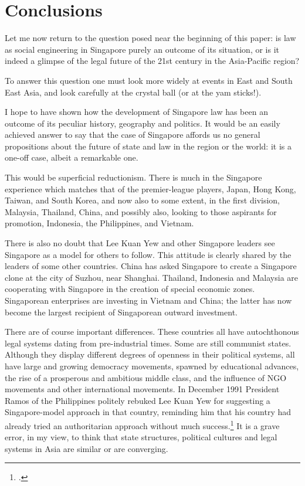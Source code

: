 \section{Conclusions}

Let me now return to the question posed near the beginning of
this paper: is law as social engineering in Singapore purely an
outcome of its situation, or is it indeed a glimpse of the legal
future of the 21st century in the Asia-Pacific region?

To answer this question one must look more widely at events in
East and South East Asia, and look carefully at the crystal ball
(or at the yam sticks!).

I hope to have shown how the development of Singapore law has
been an outcome of its peculiar history, geography and politics.
It would be an easily achieved answer to say that the case of
Singapore affords us no general propositions about the future of
state and law in the region or the world: it is a one-off case,
albeit a remarkable one.

This would be superficial reductionism. There is much in the
Singapore experience which matches that of the premier-league
players, Japan, Hong Kong, Taiwan, and South Korea, and now also
to some extent, in the first division, Malaysia, Thailand, China,
and possibly also, looking to those aspirants for promotion,
Indonesia, the Philippines, and Vietnam.

     There is also no doubt that Lee Kuan Yew and other Singapore
leaders see Singapore as a model for others to follow. This
attitude is clearly shared by the leaders of some other countries.
China has asked Singapore to create a Singapore clone at the city
of Suzhou, near Shanghai. Thailand, Indonesia and Malaysia are
cooperating with Singapore in the creation of special economic
zones. Singaporean enterprises are investing in Vietnam and China;
the latter has now become the largest recipient of Singaporean
outward investment.

There are of course important differences. These countries all
have autochthonous legal systems dating from pre-industrial
times.  Some are still communist states. Although they display
different degrees of openness in their political systems, all
have large and growing democracy movements, spawned by
educational advances, the rise of a prosperous and ambitious
middle class, and the influence of NGO movements and other
international movements. In December 1991 President Ramos of the
Philippines politely rebuked Lee Kuan Yew for suggesting a
Singapore-model approach in that country, reminding him that his
country had already tried an authoritarian approach without much
success.\footnote{ .} It is a grave
error, in my view, to think that state structures, political
cultures and legal systems in Asia are similar or are converging.


